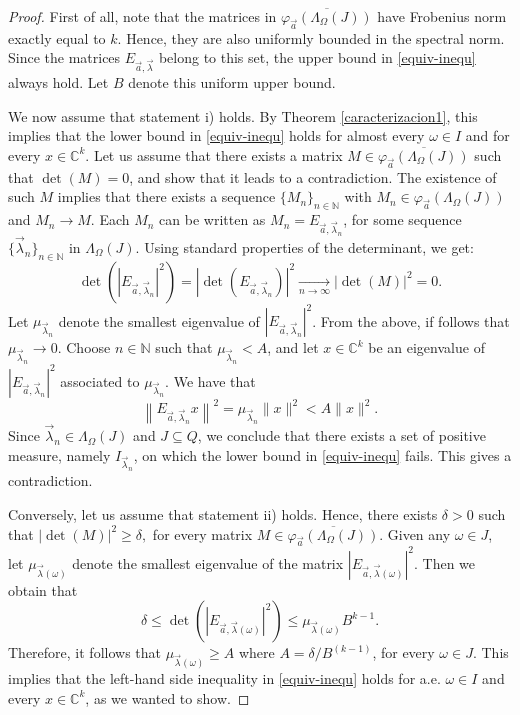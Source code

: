 \documentclass[a4paper,11pt]{amsart}
\theoremstyle{definition}
\theoremstyle{definition}
\def\fii{\varphi }
\def\la{\lambda}
\def\La{\Lambda}
\def\w{\omega}
\def\W{\Omega}
\def\N{\mathbb{N}}
\def\C{\mathbb{C}}
\begin{document}
\begin{proof}
	First of all, note that the matrices in $\overline{\fii_{\vec{a}}(\La_\W(J))}$ have Frobenius norm exactly equal to $k$. Hence, they are also uniformly bounded in the spectral norm. Since the matrices 
	$E_{\vec{a},\vec{\la}}$ belong to this set, the upper bound in \eqref{equiv-inequ} always hold. Let $B$ denote this uniform upper bound.
	
	
	We now assume that statement i) holds. By Theorem \ref{caracterizacion1}, this implies that the lower bound in \eqref{equiv-inequ} holds for almost every $\w\in I$ and for every $x\in \C^k$. Let us assume that there exists a matrix $M\in \overline{\fii_{\vec{a}}(\La_\W(J))}$ such that $\det(M)=0$, and show that it leads to a contradiction. The existence of such $M$ implies that there exists a sequence $\{M_n\}_{n\in\N}$ with $M_n\in \fii_{\vec{a}}(\La_\W(J))$ and  $M_n \to M$. Each $M_n$ can be written as $M_n=E_{\vec{a},\vec{\la}_n}$, for some sequence $\{\vec\la_n\}_{n\in\N}$ in $\La_\W(J)$. 
	Using standard properties of the determinant, we get:
	$$
	\det\left(\left|E_{\vec{a},\vec{\la}_n}\right|^2\right)=\left|\det\left(E_{\vec{a},\vec{\la}_n}\right) \right|^2\xrightarrow[n\to\infty]{} \left|\det(M)\right|^2=0. 
	$$
	Let $\mu_{\vec{\la}_n}$ denote the smallest eigenvalue of $|E_{\vec{a},\vec{\la}_n}|^2$. From the above, if follows that $\mu_{\vec{\la}_n}\to 0$. Choose $n\in\N$ such that $\mu_{\vec{\la}_n}<A$, and let $x\in \C^k$ be an eigenvalue of $|E_{\vec{a},\vec{\la}_n}|^2$ associated to $\mu_{\vec{\la}_n}$. We have that 
	$$ \left\| E_{\vec{a},\vec{\la}_n} x \right\|^2=\mu_{\vec{\la}_n}\|x\|^2<A\|x\|^2.$$
	Since $\vec{\la}_n\in \La_\W(J)$ and $J\subseteq Q$, we conclude that there exists a set of positive measure, namely $I_{\vec{\la}_n}$, on which the lower bound in \eqref{equiv-inequ} fails. This gives a contradiction.
	
	Conversely, let us assume that statement ii) holds. Hence, there exists $\delta>0$ such that
	$
	|\det(M)|^2\geq \delta,
	$
	for every matrix $M\in \overline{\fii_{\vec{a}}(\La_\W(J))}$. Given any $\w\in J$, let $\mu_{\vec{\la}(\w)}$ denote the smallest eigenvalue of the matrix $|E_{\vec{a},\vec{\la}(\w)}|^2$. Then we obtain that
	$$
	\delta\leq \det\left(\left|E_{\vec{a},\vec{\la}(\w)}\right|^2\right) \leq \mu_{\vec{\la}(\w)} B^{k-1}.
	$$
	Therefore, it follows that $\mu_{\vec{\la}(\w)}\geq A$ where $A=\delta/B^{(k-1)}$, for every $\w\in J$. This implies that the left-hand side inequality in \eqref{equiv-inequ} holds for a.e. $\w\in I$ and every $x\in \C^k$, as we wanted to show.
\end{proof}
\end{document}
